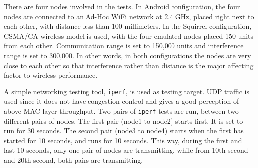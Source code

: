 \documentclass[12pt]{report}
\begin{document}
There are four nodes involved in the tests. In Android configuration, the four nodes are connected to an Ad-Hoc WiFi network at 2.4 GHz, placed right next to each other, with distance less than 100 millimeters. In the Squirrel configuration, CSMA/CA wireless model is used, with the four emulated nodes placed 150 units from each other. Communication range is set to 150,000 units and interference range is set to 300,000. In other words, in both configurations the nodes are very close to each other so that interference rather than distance is the major affecting factor to wireless performance.

A simple networking testing tool, \texttt{iperf}, is used as testing target. UDP traffic is used since it does not have congestion control and gives a good perception of above-MAC-layer throughput. Two pairs of \texttt{iperf} tests are run, between two different pairs of nodes. The first pair (node1 to node2) starts first. It is set to run for 30 seconds. The second pair (node3 to node4) starts when the first has started for 10 seconds, and runs for 10 seconds. This way, during the first and last 10 seconds, only one pair of nodes are transmitting, while from 10th second and 20th second, both pairs are transmitting.
\end{document}
